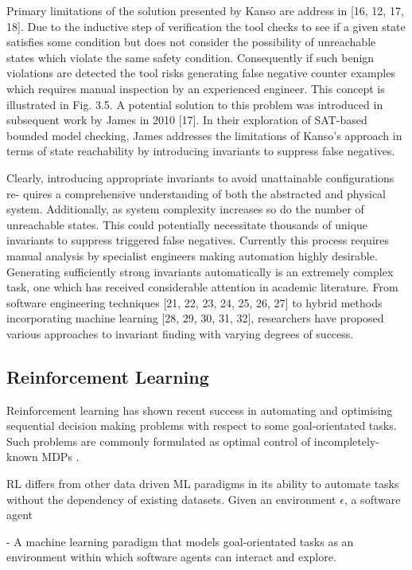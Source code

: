 \documentclass[runningheads]{llncs}
\begin{document}
Primary limitations of the solution presented by Kanso are address in [16, 12, 17, 18].
Due to the inductive step of verification the tool checks to see if a given state satisfies
some condition but does not consider the possibility of unreachable states which violate
the same safety condition. Consequently if such benign violations are detected the tool
risks generating false negative counter examples which requires manual inspection by an
experienced engineer. This concept is illustrated in Fig. 3.5. A potential solution to this
problem was introduced in subsequent work by James in 2010 [17]. In their exploration of
SAT-based bounded model checking, James addresses the limitations of Kanso’s approach
in terms of state reachability by introducing invariants to suppress false negatives.

Clearly, introducing appropriate invariants to avoid unattainable configurations re-
quires a comprehensive understanding of both the abstracted and physical system.
Additionally, as system complexity increases so do the number of unreachable states. This
could potentially necessitate thousands of unique invariants to suppress triggered false
negatives. Currently this process requires manual analysis by specialist engineers making
automation highly desirable. Generating sufficiently strong invariants automatically is
an extremely complex task, one which has received considerable attention in academic
literature. From software engineering techniques [21, 22, 23, 24, 25, 26, 27] to hybrid
methods incorporating machine learning [28, 29, 30, 31, 32], researchers have proposed
various approaches to invariant finding with varying degrees of success. 

\subsection{Reinforcement Learning}
Reinforcement learning has shown recent success in automating and optimising sequential decision making problems with respect to some goal-orientated tasks. Such problems are commonly formulated as optimal control of incompletely-known MDPs \cite{sutton2018reinforcement}. 

RL differs from other data driven ML paradigms in its ability to automate tasks without the
dependency of existing datasets. Given an environment $\epsilon$, a software agent

- A machine learning paradigm that models goal-orientated tasks as an environment within which software agents can interact and explore. 
\end{document}
